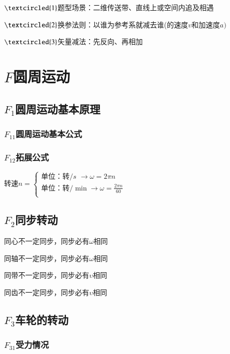 \documentclass[lang=cn,10pt]{elegantbook}
\begin{document}
        $\textcircled{1}$题型场景：二维传送带、直线上或空间内追及相遇
        
        $\textcircled{2}$换参法则：以谁为参考系就减去谁(的速度$v$和加速度$a)$
        
        $\textcircled{3}$矢量减法：先反向、再相加
        
        \section{$F$圆周运动}
        \subsection{$F_1$圆周运动基本原理}
        \subsubsection{$F_{11}$圆周运动基本公式}
        
        \vspace{3cm}
        
        \subsubsection{$F_{12}$拓展公式}
        $\text{转速}n=\begin{cases}
        	\text{单位：转}/s\,\,\rightarrow \omega =2\pi n\\
        	\text{单位：转}/\min \rightarrow \omega =\frac{2\pi n}{60}\\
        \end{cases}$
        
        \subsection{$F_2$同步转动}
        同心不一定同步，同步必有$\omega$相同
        
        同轴不一定同步，同步必有$\omega$相同
        
        同带不一定同步，同步必有$\upsilon$相同
        
        同齿不一定同步，同步必有$\upsilon$相同
        
        \subsection{$F_3$车轮的转动}
        \subsubsection{$F_{31}$受力情况}
        
\end{document}
